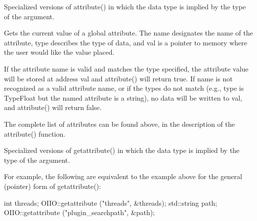 \apiend


Specialized versions of {\cf attribute()} in which the data type is
implied by the type of the argument.
\apiend




Gets the current value of a global attribute.  The {\cf name} designates
the name of the attribute, {\cf type} describes the type of data, and
{\cf val} is a pointer to memory where the user would like the value
placed.

If the attribute name is valid and matches the type specified, the
attribute value will be stored at address {\cf val} and {\cf
  attribute()} will return {\cf true}.  If {\cf name} is not recognized
as a valid attribute name, or if the types do not match (e.g., {\cf
  type} is {\cf TypeFloat} but the named attribute is a
string), no data will be written to {\cf val}, and {\cf attribute()}
will return {\cf false}.

The complete list of attributes can be found above, in the description
of the {\cf attribute()} function.
\apiend

Specialized versions of {\cf getattribute()} in which the data type is
implied by the type of the argument.

For example, the following are equivalent to the example above for the
general (pointer) form of {\cf getattribute()}:

\begin{code}
      int threads;
      OIIO::getattribute ("threads", &threads);
      std::string path;
      OIIO::getattribute ("plugin_searchpath", &path);
\end{code}
\apiend

